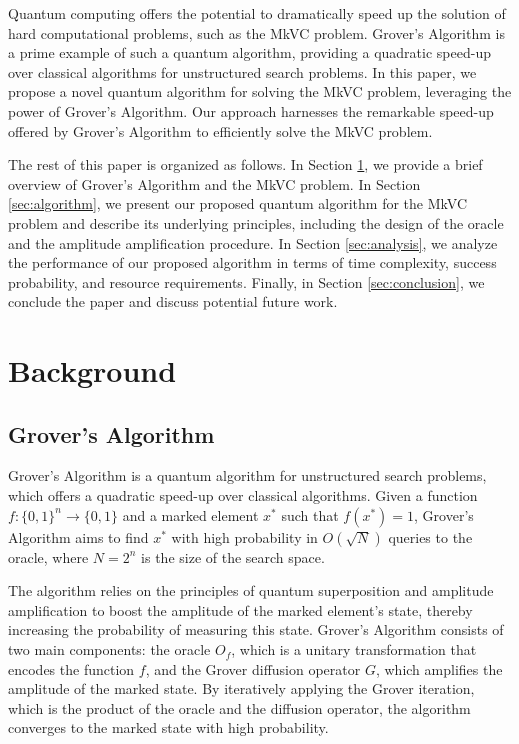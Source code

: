 Quantum computing offers the potential to dramatically speed up the solution of hard computational problems, such as the MkVC problem. Grover's Algorithm \cite{grover1996fast} is a prime example of such a quantum algorithm, providing a quadratic speed-up over classical algorithms for unstructured search problems. In this paper, we propose a novel quantum algorithm for solving the MkVC problem, leveraging the power of Grover's Algorithm. Our approach harnesses the remarkable speed-up offered by Grover's Algorithm to efficiently solve the MkVC problem.

The rest of this paper is organized as follows. In Section \ref{sec:background}, we provide a brief overview of Grover's Algorithm and the MkVC problem. In Section \ref{sec:algorithm}, we present our proposed quantum algorithm for the MkVC problem and describe its underlying principles, including the design of the oracle and the amplitude amplification procedure. In Section \ref{sec:analysis}, we analyze the performance of our proposed algorithm in terms of time complexity, success probability, and resource requirements. Finally, in Section \ref{sec:conclusion}, we conclude the paper and discuss potential future work.

\section{Background}\label{sec:background}

\subsection{Grover's Algorithm}\label{subsec:grover}

Grover's Algorithm \cite{grover1996fast} is a quantum algorithm for unstructured search problems, which offers a quadratic speed-up over classical algorithms. Given a function $f: \{0,1\}^n \rightarrow \{0,1\}$ and a marked element $x^*$ such that $f(x^*)=1$, Grover's Algorithm aims to find $x^*$ with high probability in $O(\sqrt{N})$ queries to the oracle, where $N=2^n$ is the size of the search space.

The algorithm relies on the principles of quantum superposition and amplitude amplification to boost the amplitude of the marked element's state, thereby increasing the probability of measuring this state. Grover's Algorithm consists of two main components: the oracle $O_f$, which is a unitary transformation that encodes the function $f$, and the Grover diffusion operator $G$, which amplifies the amplitude of the marked state. By iteratively applying the Grover iteration, which is the product of the oracle and the diffusion operator, the algorithm converges to the marked state with high probability.

